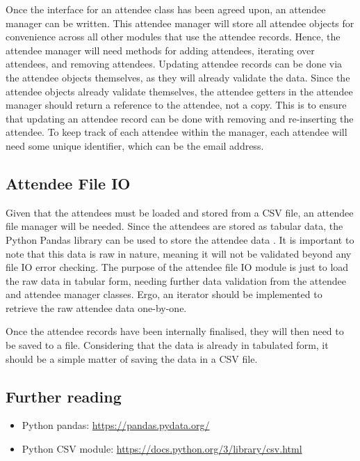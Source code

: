 \documentclass[11pt]{article}
\begin{document}
Once the interface for an attendee class has been agreed upon, an attendee manager can be written. This attendee manager will store all attendee objects for convenience across all other modules that use the attendee records. Hence, the attendee manager will need methods for adding attendees, iterating over attendees, and removing attendees. Updating attendee records can be done via the attendee objects themselves, as they will already validate the data. Since the attendee objects already validate themselves, the attendee getters in the attendee manager should return a reference to the attendee, not a copy. This is to ensure that updating an attendee record can be done with removing and re-inserting the attendee. To keep track of each attendee within the manager, each attendee will need some unique identifier, which can be the email address.

\subsection{Attendee File IO}

Given that the attendees must be loaded and stored from a CSV file, an attendee file manager will be needed. Since the attendees are stored as tabular data, the Python Pandas library can be used to store the attendee data \cite{panda}. It is important to note that this data is raw in nature, meaning it will not be validated beyond any file IO error checking. The purpose of the attendee file IO module is just to load the raw data in tabular form, needing further data validation from the attendee and attendee manager classes. Ergo, an iterator should be implemented to retrieve the raw attendee data one-by-one.

Once the attendee records have been internally finalised, they will then need to be saved to a file. Considering that the data is already in tabulated form, it should be a simple matter of saving the data in a CSV file.

\subsection{Further reading}

\begin{itemize}
    \item Python pandas: \url{https://pandas.pydata.org/}
    \item Python CSV module: \url{https://docs.python.org/3/library/csv.html}
\end{itemize}
\end{document}
